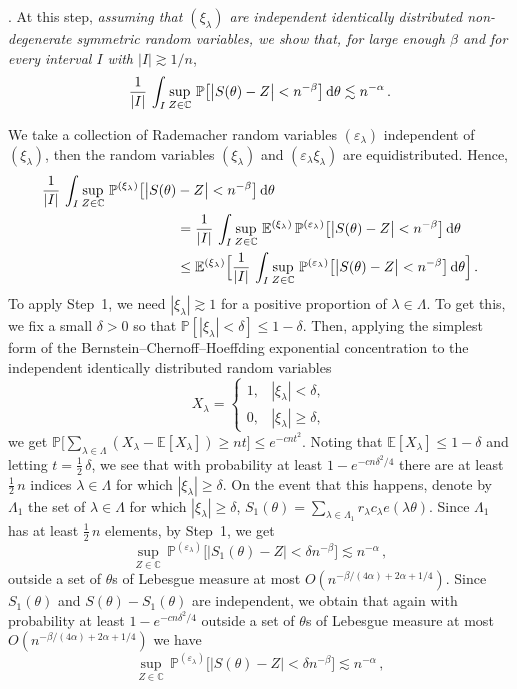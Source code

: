 \documentclass[11pt]{amsart}
\numberwithin{equation}{section}
\def\ep{{\varepsilon}}
\newcommand{\bC}{\mathbb C}
\newcommand{\bP}{\mathbb P}
\newcommand{\bE}{\mathbb E}
\begin{document}
\medskip{}. At this step, {\em assuming that
$(\xi_\lambda)$ are independent identically distributed non-degenerate
symmetric random variables,
we show that, for large enough $\beta$ and for every interval $I$ with $|I|\gtrsim 1/n$},
\[
\frac1{|I|}\, \int_I
\sup_{Z\in\bC}\, \bP\bigl[ \bigl| S(\theta) - Z \bigr| < n^{-\beta} \bigr]\,
{\rm d}\theta \lesssim n^{-\alpha}\,.
\]

\medskip
We take a collection of Rademacher random variables $(\ep_\lambda)$ independent of $(\xi_\lambda)$,
then the random variables $(\xi_\lambda)$ and $(\ep_\lambda\xi_\lambda)$ are equidistributed.
Hence,
\begin{align}\label{eq:star}
\nonumber \frac1{|I|}\,
\int_I \sup_{Z\in\bC}\, \bP^{(\xi_\lambda)}\bigl[ \bigl| S(\theta) &- Z \bigr| <  n^{-\beta} \bigr]\, {\rm d}\theta \\
\nonumber &= \frac1{|I|}\,
\int_I \sup_{Z\in\bC}\, \bE^{(\xi_\lambda)}\, \bP^{(\ep_\lambda)}\bigl[ \bigl| S(\theta) - Z \bigr|
< n^{-\beta} \bigr]\, {\rm d}\theta \\
&\le \bE^{(\xi_\lambda)} \Bigl[ \frac1{|I|}\,
\int_I  \sup_{Z\in\bC}\,  \bP^{(\ep_\lambda)}\bigl[ \bigl| S(\theta) - Z \bigr| < n^{-\beta} \bigr]\, {\rm d}\theta \Bigr]\,.
\end{align}
To apply Step~1, we need $|\xi_\lambda|\gtrsim 1$ for a positive proportion of $\lambda\in \Lambda$.
To get this, we fix a small $\delta>0$ so that $\bP[|\xi_\lambda|<\delta]\le 1-\delta$.
Then, applying the simplest form of the Bernstein--Chernoff--Hoeffding exponential concentration
to the independent identically distributed random variables
\[
X_\lambda =
\begin{cases}
1, &|\xi_\lambda|<\delta, \\
0, &|\xi_\lambda|\ge\delta,
\end{cases}
\]
we get $ \bP\bigl[ \sum_{\lambda\in\Lambda} (X_\lambda - \bE[X_\lambda]) \ge nt \bigr] \le e^{-cnt^2} $. Noting that $\bE[X_\lambda]\le 1-\delta$ and letting $t=\tfrac12\, \delta$,
we see that with probability at least $1-e^{-cn\delta^2/4}$ there are at least $\tfrac12\,   n$
indices $\lambda\in\Lambda$ for which $|\xi_\lambda|\ge \delta$. On the event that
this happens, denote by $\Lambda_1$ the set of $\lambda\in\Lambda$ for which $|\xi_\lambda|\ge \delta$, 
$S_1(\theta) = \sum_{\lambda\in\Lambda_1} r_\lambda c_\lambda e(\lambda\theta)$. 
Since $\Lambda_1$ has at least $\tfrac12\,   n$ elements, 
by Step~1, we get
\[
\sup_{Z\in\bC}\,  \bP^{(\ep_\lambda)}\bigl[ \bigl| S_1(\theta) - Z \bigr| < \delta n^{-\beta} \bigr]
\lesssim n^{-\alpha}\,,
\]
outside a set of $\theta$s of Lebesgue measure at most $O(n^{-\beta/(4\alpha) + 2\alpha + 1/4})$.
Since $S_1(\theta)$ and $S(\theta)-S_1(\theta)$ are independent, we obtain that again with probability at least $1-e^{-cn\delta^2/4}$ 
outside a set of $\theta$s of Lebesgue measure at most $O(n^{-\beta/(4\alpha) + 2\alpha + 1/4})$ we have
\[
\sup_{Z\in\bC}\,  \bP^{(\ep_\lambda)}\bigl[ \bigl| S(\theta) - Z \bigr| < \delta n^{-\beta} \bigr]
\lesssim n^{-\alpha}\,,
\]
\end{document}
